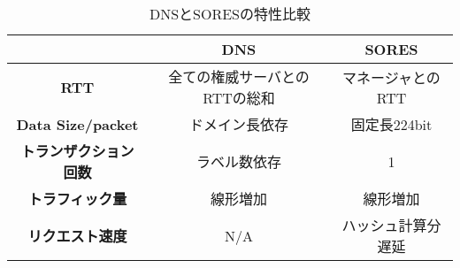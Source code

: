 \begin{table}[htb]
 \centering
  \begin{tabular}{ccc}
    \toprule
     & \textbf{DNS} & \textbf{SORES} \\
    \midrule
    \textbf{RTT} & 全ての権威サーバとのRTTの総和 & マネージャとのRTT  \\ \hline
    \textbf{Data Size/packet} & ドメイン長依存 & 固定長224bit  \\ \hline
    \textbf{トランザクション回数} & ラベル数依存 & 1 \\ \hline
    \textbf{トラフィック量} & 線形増加 & 線形増加 \\
    \textbf{リクエスト速度} & N/A & ハッシュ計算分遅延 \\
    \bottomrule
  \end{tabular}
 \caption{DNSとSORESの特性比較}
 \label{tab:resource-record}
\end{table}
